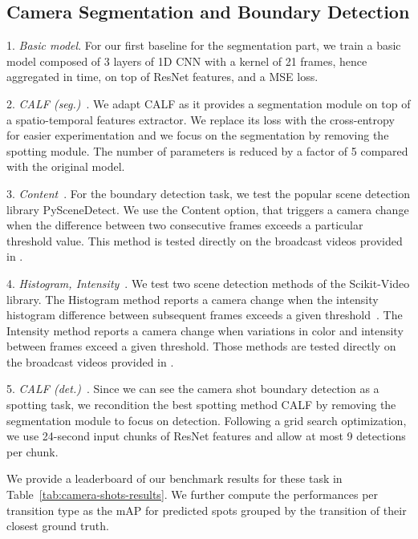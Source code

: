 \documentclass[final]{cvsports}
\begin{document}
\subsection{Camera Segmentation and Boundary Detection}

1. \emph{Basic model}. For our first baseline for the segmentation part, we train a basic model composed of 3 layers of 1D CNN with a kernel of 21 frames, hence aggregated in time, on top of ResNet features, and a MSE loss.

2. \emph{CALF (seg.)}~\cite{cioppa2020context}. We adapt CALF as it provides a segmentation module on top of a spatio-temporal features extractor. We replace its loss with the cross-entropy for easier experimentation and we focus on the segmentation by removing the spotting module. The number of parameters is reduced by a factor of 5 compared with the original model.

3. \emph{Content}~\cite{PySceneDetect}. For the boundary detection task, we test the popular scene detection library PySceneDetect. We use the Content option, that triggers a camera change when the difference between two consecutive frames exceeds a particular threshold value. This method is tested directly on the broadcast videos provided in \SoccerNet.

4. \emph{Histogram, Intensity}~\cite{scikitvideo}. We test two scene detection methods of the Scikit-Video library. The Histogram method reports a camera change when the intensity histogram difference between subsequent frames exceeds a given threshold~\cite{Otsuji93projection}. The Intensity method reports a camera change when variations in color and intensity between frames exceed a given threshold. Those methods are tested directly on the broadcast videos provided in \SoccerNet.

5. \emph{CALF (det.)}~\cite{cioppa2020context}. Since we can see the camera shot boundary detection as a spotting task, we recondition the best spotting method CALF by removing the segmentation module to focus on detection. Following a grid search optimization, we use 24-second input chunks of ResNet features and allow at most 9 detections per chunk.



 We provide a leaderboard of our benchmark results for these task in Table~\ref{tab:camera-shots-results}. 
We further compute the performances per transition type as the mAP for predicted spots grouped by the transition of their closest ground truth. 
\end{document}

